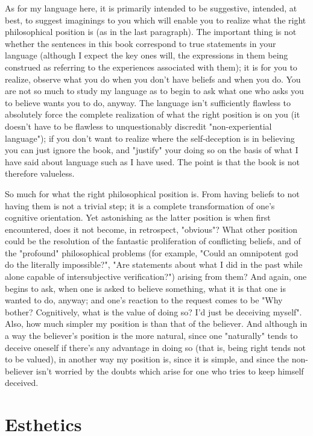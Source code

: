 \documentclass[10pt,twoside]{memoir}
\begin{document}
\begin{enumerate}
{As for my language here, it is primarily intended to be suggestive, 
intended, at best, to suggest imaginings to you which will enable you to 
realize what the right philosophical position is (as in the last paragraph). The 
important thing is not whether the sentences in this book correspond to true 
statements in your language (although I expect the key ones will, the 
expressions in them being construed as referring to the experiences 
associated with them); it is for you to realize, observe what you do when 
you don't have beliefs and when you do. You are not so much to study my 
language as to begin to ask what one who asks you to believe wants you to 
do, anyway. The language isn't sufficiently flawless to absolutely force the 
complete realization of what the right position is on you (it doesn't have to 
be flawless to unquestionably discredit "non-experiential language"); if you 
don't want to realize where the self-deception is in believing you can just 
ignore the book, and "justify" your doing so on the basis of what I have said 
about language such as I have used. The point is that the book is not 
therefore valueless. 

So much for what the right philosophical position is. From having 
beliefs to not having them is not a trivial step; it is a complete 
transformation of one's cognitive orientation. Yet astonishing as the latter 
position is when first encountered, does it not become, in retrospect, 
"obvious"? What other position could be the resolution of the fantastic 
proliferation of conflicting beliefs, and of the "profound" philosophical 
problems (for example, "Could an omnipotent god do the literally 
impossible?", "Are statements about what I did in the past while alone 
capable of intersubjective verification?") arising from them? And again, one 
begins to ask, when one is asked to believe something, what it is that one is 
wanted to do, anyway; and one's reaction to the request comes to be "Why 
bother? Cognitively, what is the value of doing so? I'd just be deceiving 
myself". Also, how much simpler my position is than that of the believer. 
And although in a way the believer's position is the more natural, since one 
"naturally" tends to deceive oneself if there's any advantage in doing so 
(that is, being right tends not to be valued), in another way my position is, 
since it is simple, and since the non-believer isn't worried by the doubts 
which arise for one who tries to keep himself deceived. 

\part{Esthetics}

}
\end{enumerate}
\end{document}
